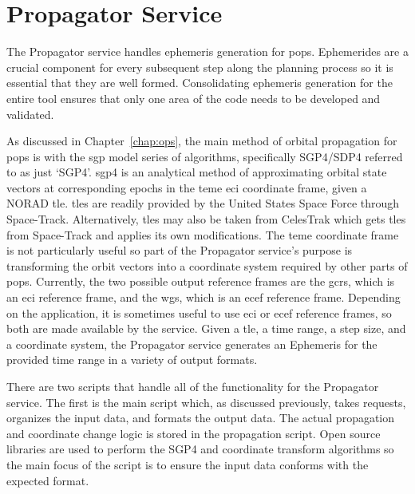 
\section{Propagator Service}

The Propagator service handles ephemeris generation for \gls{pops}.
Ephemerides are a crucial component for every subsequent step along the
planning process so it is essential that they are well formed. Consolidating
ephemeris generation for the entire tool ensures that only one area of the code
needs to be developed and validated.

As discussed in Chapter~\ref{chap:ops}, the main method of orbital propagation
for \gls{pops} is with the \gls{sgp} model series of algorithms, specifically
SGP4/SDP4 referred to as just ‘SGP4’.  \gls{sgp4} is an analytical method of
approximating orbital state vectors at corresponding epochs in the \gls{teme}
\gls{eci} coordinate frame, given a NORAD \gls{tle}.  \gls{tle}s are readily
provided by the United States Space Force through Space-Track.  Alternatively,
\glspl{tle} may also be taken from CelesTrak which gets \glspl{tle} from
Space-Track and applies its own modifications.  The \gls{teme} coordinate frame
is not particularly useful so part of the Propagator service’s purpose is
transforming the orbit vectors into a coordinate system required by other parts
of \gls{pops}.  Currently, the two possible output reference frames are the
\gls{gcrs}, which is an \gls{eci} reference frame, and the \gls{wgs}, which is
an \gls{ecef} reference frame.  Depending on the application, it is sometimes
useful to use \gls{eci} or \gls{ecef} reference frames, so both are made
available by the service.  Given a \gls{tle}, a time range, a step size, and a
coordinate system, the Propagator service generates an Ephemeris for the
provided time range in a variety of output formats.

There are two scripts that handle all of the functionality for the Propagator
service. The first is the main script which, as discussed previously, takes
requests, organizes the input data, and formats the output data. The actual
propagation and coordinate change logic is stored in the propagation script.
Open source libraries are used to perform the SGP4 and coordinate transform
algorithms so the main focus of the script is to ensure the input data conforms
with the expected format.  

